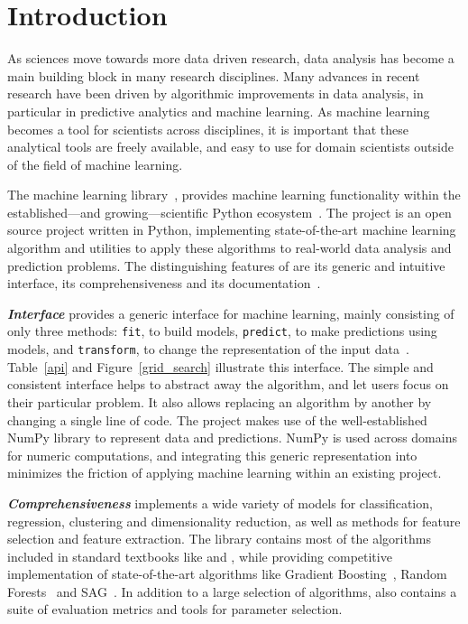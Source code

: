 \setcounter{section}{0}
\section{Introduction}
As sciences move towards more data driven research, data analysis has
become a main building block in many research disciplines.
Many advances in recent research have been driven by algorithmic improvements
in data analysis, in particular in predictive analytics and machine learning.
As machine learning becomes a tool for scientists across disciplines, it is
important that these analytical tools are freely available, and easy to use for
domain scientists outside of the field of machine learning.


The \sklearn{} machine learning library~\autocite{pedregosa2011scikit},
provides machine learning functionality within the established---and
growing---scientific Python ecosystem~\autocite{benlorica, infoworld}.
The \sklearn{} project is an open source project written in Python, implementing
state-of-the-art machine
learning algorithm and utilities to apply these algorithms to real-world data
analysis and prediction problems.
%
The distinguishing features of \sklearn{} are its generic and intuitive
interface, its comprehensiveness and its
documentation~\autocite{Varoquaux_2015, benlorica}.

\emph{\textbf{Interface}} \sklearn{} provides a generic interface for machine
learning, mainly consisting of only three methods: \texttt{fit}, to build
models, \texttt{predict}, to make predictions using models, and
\texttt{transform}, to change the representation of the input
data~\autocite{buitinck2013api}.
Table~\ref{api} and Figure~\ref{grid_search} illustrate this interface. The
simple and consistent interface helps to abstract away the algorithm, and let
users focus on their particular problem. It also allows replacing an algorithm
by another by changing a single line of code. The \sklearn{} project{} makes use of the
well-established NumPy library to represent data and predictions.  NumPy is
used across domains for numeric computations, and integrating this generic
representation into \sklearn{} minimizes the friction of applying machine
learning within an existing project.

\emph{\textbf{Comprehensiveness}} \sklearn{} implements a wide variety of
models for classification, regression, clustering and dimensionality reduction,
as well as methods for feature selection and feature extraction. The library
contains most of the algorithms included in standard textbooks like
\textcite{bishop2001bishop} and \textcite{friedman2001elements}, while
providing competitive implementation of state-of-the-art algorithms like
Gradient Boosting~\autocite{friedman2001greedy}, Random
Forests~\autocite{breiman2001random} and SAG~\autocite{roux2012stochastic}.  In
addition to a large selection of algorithms, \sklearn{} also contains a suite
of evaluation metrics and tools for parameter selection.


